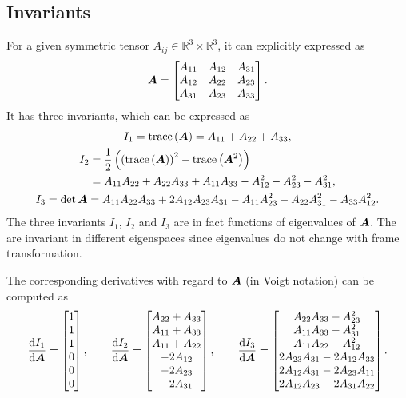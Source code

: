 \subsection{Invariants}
For a given symmetric tensor $A_{ij}\in\mathbb{R}^3\times\mathbb{R}^3$, it can explicitly expressed as
\begin{gather}
\bm{A}=
\begin{bmatrix}
A_{11}&A_{12}&A_{31}\\
A_{12}&A_{22}&A_{23}\\
A_{31}&A_{23}&A_{33}
\end{bmatrix}.
\end{gather}
It has three invariants, which can be expressed as
\begin{gather}\label{eq:tensor_invariant}
I_1=\text{trace}\left(\bm{A}\right)=A_{11}+A_{22}+A_{33},\\
\begin{split}
I_2&=\dfrac{1}{2}\left(\left(\text{trace}\left(\bm{A}\right)\right)^2-\text{trace}\left(\bm{A}^2\right)\right)\\
&=A_{11}A_{22}+A_{22}A_{33}+A_{11}A_{33}-A_{12}^2-A_{23}^2-A_{31}^2,
\end{split}\\
I_3=\det{\bm{A}}=A_{11}A_{22}A_{33}+2A_{12}A_{23}A_{31}-A_{11}A_{23}^2-A_{22}A_{31}^2-A_{33}A_{12}^2.
\end{gather}
The three invariants $I_1$, $I_2$ and $I_3$ are in fact functions of eigenvalues of $\bm{A}$.
The are invariant in different eigenspaces since eigenvalues do not change with frame transformation.

The corresponding derivatives with regard to $\bm{A}$ (in Voigt notation) can be computed as
\begin{gather}\label{eq:tensor_invariant_derivative}
	\dfrac{\mathrm{d}I_1}{\mathrm{d}\bm{A}}=\begin{bmatrix}
		1 \\
		1 \\
		1 \\
		0 \\
		0 \\
		0
	\end{bmatrix},\qquad
	\dfrac{\mathrm{d}I_2}{\mathrm{d}\bm{A}}=\begin{bmatrix}
		A_{22}+A_{33} \\
		A_{11}+A_{33} \\
		A_{11}+A_{22} \\
		-2A_{12}      \\
		-2A_{23}      \\
		-2A_{31}
	\end{bmatrix},\qquad
	\dfrac{\mathrm{d}I_3}{\mathrm{d}\bm{A}}=\begin{bmatrix}
		A_{22}A_{33}-A_{23}^2       \\
		A_{11}A_{33}-A_{31}^2       \\
		A_{11}A_{22}-A_{12}^2       \\
		2A_{23}A_{31}-2A_{12}A_{33} \\
		2A_{12}A_{31}-2A_{23}A_{11} \\
		2A_{12}A_{23}-2A_{31}A_{22}
	\end{bmatrix}.
\end{gather}

